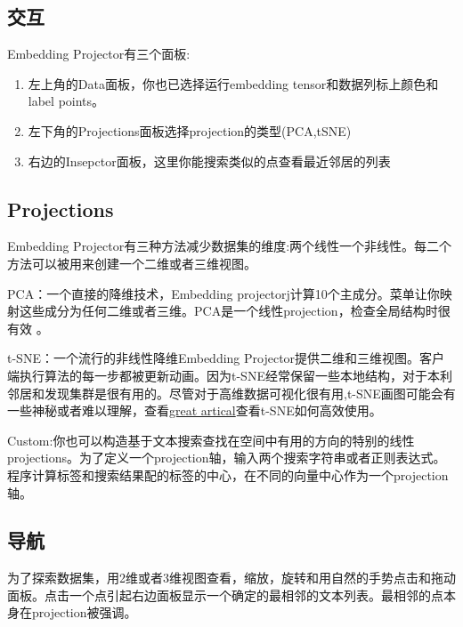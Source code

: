 \subsection{交互}
Embedding Projector有三个面板:
\begin{enumerate}
	\item 左上角的Data面板，你也已选择运行embedding tensor和数据列标上颜色和label points。
	\item 左下角的Projections面板选择projection的类型(PCA,tSNE)
	\item 右边的Insepctor面板，这里你能搜索类似的点查看最近邻居的列表
\end{enumerate}
\subsection{Projections}
Embedding Projector有三种方法减少数据集的维度:两个线性一个非线性。每二个方法可以被用来创建一个二维或者三维视图。

PCA：一个直接的降维技术，Embedding projectorj计算10个主成分。菜单让你映射这些成分为任何二维或者三维。PCA是一个线性projection，检查全局结构时很有效
。

t-SNE：一个流行的非线性降维Embedding Projector提供二维和三维视图。客户端执行算法的每一步都被更新动画。因为t-SNE经常保留一些本地结构，对于本利邻居和发现集群是很有用的。尽管对于高维数据可视化很有用,t-SNE画图可能会有一些神秘或者难以理解，查看\href{http://distill.pub/2016/misread-tsne/}{great artical}查看t-SNE如何高效使用。

Custom:你也可以构造基于文本搜索查找在空间中有用的方向的特别的线性projections。为了定义一个projection轴，输入两个搜索字符串或者正则表达式。程序计算标签和搜索结果配的标签的中心，在不同的向量中心作为一个projection轴。
\subsection{导航}
为了探索数据集，用2维或者3维视图查看，缩放，旋转和用自然的手势点击和拖动面板。点击一个点引起右边面板显示一个确定的最相邻的文本列表。最相邻的点本身在projection被强调。

